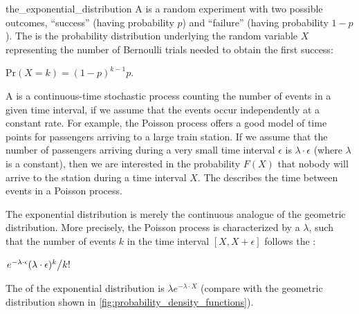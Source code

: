 \begin{detour}{the_exponential_distribution}
A  is a random experiment with two possible outcomes, ``success'' (having probability $p$) and ``failure'' (having probability $1-p$). The  is the probability distribution underlying the random variable $X$ representing the number of Bernoulli trials needed to obtain the first success:

\begin{center}
$\mathrm{Pr}(X = k) = (1-p)^{k-1}p$.
\end{center}

A  is a continuous-time stochastic process counting the number of events in a given time interval, if we assume that the events occur independently at a constant rate. For example, the Poisson process offers a good model of time points for passengers arriving to a large train station.  If we assume that the number of passengers arriving during a very small time interval $\epsilon$ is $\lambda \cdot \epsilon$ (where $\lambda$ is a constant), then we are interested in the probability $F(X)$ that nobody will arrive to the station during a time interval $X$. The  describes the time between events in a Poisson process.\\

\begin{qbox}\end{qbox}

\noindent The exponential distribution is merely the continuous analogue of the geometric distribution. More precisely, the Poisson process is characterized by a  $\lambda$, such that the number of events $k$ in the time interval $[X, X+\epsilon]$ follows the :

\begin{center}
$\left. e^{-\lambda \cdot \epsilon}(\lambda \cdot \epsilon)^k \middle/ k!\right.$
\end{center}

\noindent The  of the exponential distribution is  $\lambda e^{-\lambda \cdot X}$ (compare with the geometric distribution shown in \autoref{fig:probability_density_functions}).\\


\end{detour}

